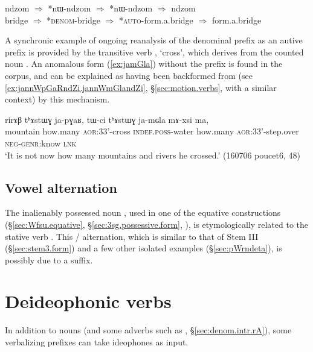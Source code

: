 \begin{exe}
\ex \label{ex:nW.backformation}
\gll   ndzom $\Rightarrow$ *nɯ-ndzom $\Rightarrow$ *nɯ-ndzom $\Rightarrow$ ndzom \\
bridge $\Rightarrow$ *\textsc{denom}-bridge  $\Rightarrow$ *\textsc{auto}-form.a.bridge $\Rightarrow$  form.a.bridge \\
\end{exe}

A synchronic example of ongoing reanalysis of the  denominal prefix as an autive prefix is provided by the transitive verb , `cross', which derives from the counted noun . An anomalous form  (\ref{ex:jamGla}) without the  prefix is found in the corpus, and can be explained as having been backformed from  (see \ref{ex:jannWpGaRndZi.jannWmGlandZi}, §\ref{sec:motion.verbs}, with a similar context) by this mechanism.
 
\begin{exe}
\ex \label{ex:jamGla}
\gll rirɤβ tʰɤstɯɣ ja-pɣaʁ, tɯ-ci tʰɤstɯɣ ja-mɢla mɤ-xsi ma, \\
mountain how.many \textsc{aor}:3\fl{}3'-cross \textsc{indef}.\textsc{poss}-water how.many \textsc{aor}:3\fl{}3'-step.over \textsc{neg}-\textsc{genr}:know \textsc{lnk} \\
\glt `It is not now how many mountains and rivers he crossed.' (160706 poucet6, 48)
\end{exe}


\subsection{Vowel alternation}  \label{sec:fsu.fse}
The inalienably possessed noun , used in one of the equative constructions (§\ref{sec:Wfsu.equative}, §\ref{sec:3sg.possessive.form}, \citealt{jacques18similative}), is etymologically related to the stative verb . This  /  alternation, which is similar to that of Stem III (§\ref{sec:stem3.form}) and a few other isolated examples (§\ref{sec:pWrndeta}), is possibly due to a  suffix.

 
\section{Deideophonic verbs}  \label{sec:voice.deideophonic}
In addition to nouns (and some adverbs such as  , §\ref{sec:denom.intr.rA}), some verbalizing prefixes can take ideophones as input. 


